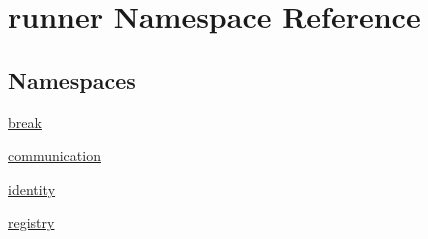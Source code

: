 \hypertarget{namespacerunner}{}\section{runner Namespace Reference}
\label{namespacerunner}
\subsection*{Namespaces}
\begin{DoxyCompactItemize}
\item 
 \hyperlink{namespacerunner_1_1break}{break}
\item 
 \hyperlink{namespacerunner_1_1communication}{communication}
\item 
 \hyperlink{namespacerunner_1_1identity}{identity}
\item 
 \hyperlink{namespacerunner_1_1registry}{registry}
\end{DoxyCompactItemize}
